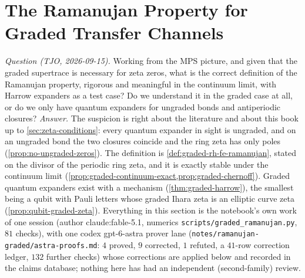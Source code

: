 
\section{The Ramanujan Property for Graded Transfer Channels}
\label{sec:graded-ramanujan}

\emph{Question (TJO, 2026-09-15).} Working from the MPS picture, and given that the graded
supertrace is necessary for zeta zeros, what is the correct definition of the Ramanujan property,
rigorous and meaningful in the continuum limit, with Harrow expanders as a test case? Do we
understand it in the graded case at all, or do we only have quantum expanders for ungraded bonds
and antiperiodic closures? \emph{Answer.} The suspicion is right about the literature and about
this book up to \cref{sec:zeta-conditions}: every quantum expander in sight is ungraded, and on an
ungraded bond the two closures coincide and the ring zeta has only poles
(\cref{prop:no-ungraded-zeros}). The definition is \cref{def:graded-rh-fe-ramanujan}, stated on
the divisor of the periodic ring zeta, and it is exactly stable under the continuum limit
(\cref{prop:graded-continuum-exact,prop:graded-chernoff}). Graded quantum expanders exist with a
mechanism (\cref{thm:graded-harrow}), the smallest being a qubit with Pauli letters whose graded
Ihara zeta is an elliptic curve zeta (\cref{prop:qubit-graded-zeta}). Everything in this section is
the notebook's own work of one session (author claude:fable-5.1, numerics
\texttt{scripts/graded\_ramanujan.py}, $81$ checks), with one codex gpt-6-astra prover lane
(\texttt{notes/ramanujan-graded/astra-proofs.md}: $4$ proved, $9$ corrected, $1$ refuted, a
$41$-row correction ledger, $132$ further checks) whose corrections are applied below and recorded
in the claims database; nothing here has had an independent (second-family) review.

